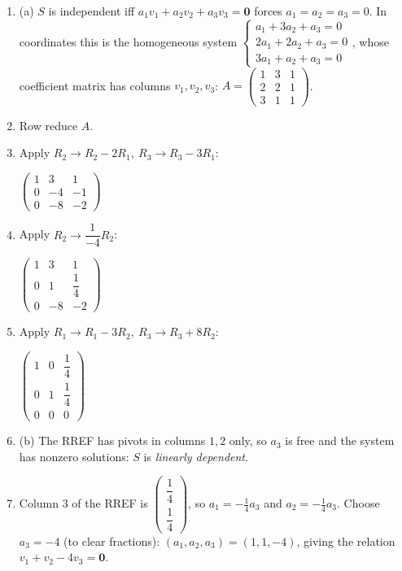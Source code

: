 \documentclass[11pt]{article}
\begin{document}
\begin{tcolorbox}[breakable,colback=ans,colframe=ansb,boxrule=0.5pt,left=4pt,right=4pt,top=2pt,bottom=2pt]\begin{enumerate}[leftmargin=3.1em,itemsep=1pt,topsep=1pt,label=\textbf{Step \arabic*.}]\item (a) $S$ is independent iff $a_1v_1+a_2v_2+a_3v_3=\mathbf 0$ forces $a_1=a_2=a_3=0$. In coordinates this is the homogeneous system $\begin{cases}a_1+3a_2+a_3=0\\ 2a_1+2a_2+a_3=0\\ 3a_1+a_2+a_3=0\end{cases}$, whose coefficient matrix has columns $v_1,v_2,v_3$: $A=\begin{pmatrix}1 & 3 & 1 \\ 2 & 2 & 1 \\ 3 & 1 & 1\end{pmatrix}$.
\item Row reduce $A$.
\item Apply $R_2\to R_2-2R_1,\ R_3\to R_3-3R_1$:\par\smallskip $\displaystyle \begin{pmatrix}1 & 3 & 1 \\ 0 & -4 & -1 \\ 0 & -8 & -2\end{pmatrix}$
\item Apply $R_2\to \dfrac{1}{-4} R_2$:\par\smallskip $\displaystyle \begin{pmatrix}1 & 3 & 1 \\ 0 & 1 & \dfrac{1}{4} \\ 0 & -8 & -2\end{pmatrix}$
\item Apply $R_1\to R_1-3R_2,\ R_3\to R_3+8R_2$:\par\smallskip $\displaystyle \begin{pmatrix}1 & 0 & \dfrac{1}{4} \\ 0 & 1 & \dfrac{1}{4} \\ 0 & 0 & 0\end{pmatrix}$
\item (b) The RREF has pivots in columns $1,2$ only, so $a_3$ is free and the system has nonzero solutions: $S$ is \emph{linearly dependent}.
\item Column $3$ of the RREF is $\begin{pmatrix}\dfrac{1}{4}\\\dfrac{1}{4}\end{pmatrix}$, so $a_1=-\tfrac14a_3$ and $a_2=-\tfrac14a_3$. Choose $a_3=-4$ (to clear fractions): $(a_1,a_2,a_3)=(1,1,-4)$, giving the relation $v_1+v_2-4v_3=\mathbf 0$.

\end{enumerate}
\end{tcolorbox}
\end{document}
